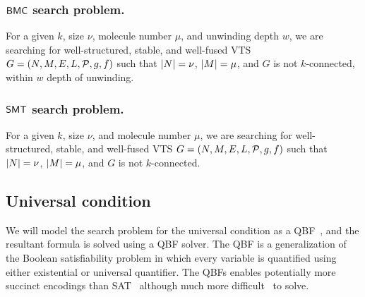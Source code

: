 \subsubsection{$\mathsf{BMC}$ search problem.}
For a given $k$, size $\nu$, molecule number $\mu$, and unwinding depth $w$,
we are searching for well-structured, stable, and well-fused VTS
$G = (N,M,E,L,\mathcal{P},g,f)$ such that
$|N| = \nu$, $|M| = \mu$, and $G$ is not $k$-connected, within $w$ depth of unwinding.    

\subsubsection{$\mathsf{SMT}$ search problem.}
For a given $k$, size $\nu$, and molecule number $\mu$,
we are searching for well-structured, stable, and well-fused VTS
$G = (N,M,E,L,\mathcal{P},g,f)$ such that
$|N| = \nu$, $|M| = \mu$, and
$G$ is not $k$-connected.    

%
%
%
%

\subsection{Universal condition}
\noindent We will model the search problem for the universal condition as a QBF~\cite{buning2009theory, benedetti2008qbf}, and the resultant formula is solved using a QBF solver.
%
The QBF is a generalization of the Boolean satisfiability problem in which every variable is quantified using either existential or universal quantifier.
%
The QBFs enables potentially more succinct encodings than SAT~\cite{jussila2007compressing} although much more difficult~\cite{savitch1970relationships, stockmeyer1973word} to solve.
 
